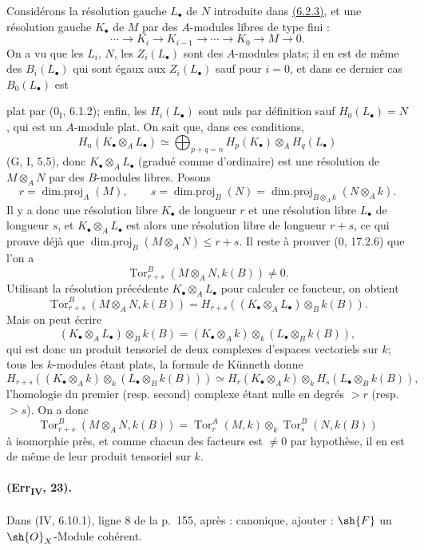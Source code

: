 Considérons la résolution gauche $L_\bullet$ de $N$ introduite dans
{\hyperref[canon-index.ega4.c04.prop.6-2-3]{(6.2.3)}}, et une résolution gauche
$K_\bullet$ de $M$ par des $A$-modules libres de type fini :
\[
 \cdots\longrightarrow K_i\longrightarrow K_{i-1}\longrightarrow
 \cdots\longrightarrow K_0\longrightarrow M\longrightarrow0.
\]
On a vu que les $L_i$, $N$, les $Z_i(L_\bullet)$ sont des $A$-modules
plats; il en est de même des $B_i(L_\bullet)$ qui sont égaux aux
$Z_i(L_\bullet)$ sauf pour $i=0$, et dans ce dernier cas
$B_0(L_\bullet)$ est

plat par ($0_{\mathrm I}$, 6.1.2); enfin, les $H_i(L_\bullet)$ sont nuls
par définition sauf $H_0(L_\bullet)=N$, qui est un $A$-module plat. On
sait que, dans ces conditions,
\[
 H_n(K_\bullet\otimes_AL_\bullet)\simeq
 \bigoplus_{p+q=n}
 H_p(K_\bullet)\otimes_AH_q(L_\bullet)
\]
(G, I, 5.5), donc $K_\bullet\otimes_AL_\bullet$ (gradué comme
d'ordinaire) est une résolution de $M\otimes_AN$ par des $B$-modules
libres. Posons
\[
 r=\operatorname{dim.proj}_A(M),\qquad
 s=\operatorname{dim.proj}_B(N)=
 \operatorname{dim.proj}_{B\otimes_Ak}(N\otimes_Ak).
\]
Il y a donc une résolution libre $K_\bullet$ de longueur $r$ et une
résolution libre $L_\bullet$ de longueur $s$, et
$K_\bullet\otimes_AL_\bullet$ est alors une résolution libre de longueur
$r+s$, ce qui prouve déjà que
$\operatorname{dim.proj}_B(M\otimes_AN)\leq r+s$. Il reste à prouver
($0$, 17.2.6) que l'on a
\[
 \operatorname{Tor}^{B}_{r+s}(M\otimes_AN,k(B))\neq0.
\]
Utilisant la résolution précédente $K_\bullet\otimes_AL_\bullet$ pour
calculer ce foncteur, on obtient
\[
 \operatorname{Tor}^{B}_{r+s}(M\otimes_AN,k(B))=
 H_{r+s}((K_\bullet\otimes_AL_\bullet)\otimes_Bk(B)).
\]
Mais on peut écrire
\[
 (K_\bullet\otimes_AL_\bullet)\otimes_Bk(B)=
 (K_\bullet\otimes_Ak)\otimes_k
 (L_\bullet\otimes_Bk(B)),
\]
qui est donc un produit tensoriel de deux complexes d'espaces
vectoriels sur $k$; tous les $k$-modules étant plats, la formule de
Künneth donne
\[
 H_{r+s}((K_\bullet\otimes_Ak)\otimes_k
 (L_\bullet\otimes_Bk(B)))\simeq
 H_r(K_\bullet\otimes_Ak)\otimes_k
 H_s(L_\bullet\otimes_Bk(B)),
\]
l'homologie du premier (resp. second) complexe étant nulle en degrés
$>r$ (resp. $>s$). On a donc
\[
 \operatorname{Tor}^{B}_{r+s}(M\otimes_AN,k(B))=
 \operatorname{Tor}^{A}_{r}(M,k)\otimes_k
 \operatorname{Tor}^{B}_{s}(N,k(B))
\]
à isomorphie près, et comme chacun des facteurs est $\neq0$ par
hypothèse, il en est de même de leur produit tensoriel sur $k$.

\paragraph{(Err\textsubscript{IV}, 23).}
Dans (IV, 6.10.1), ligne 8 de la p.~155, après : canonique, ajouter :
$\sh{F}$ un $\sh{O}_X$-Module cohérent.

